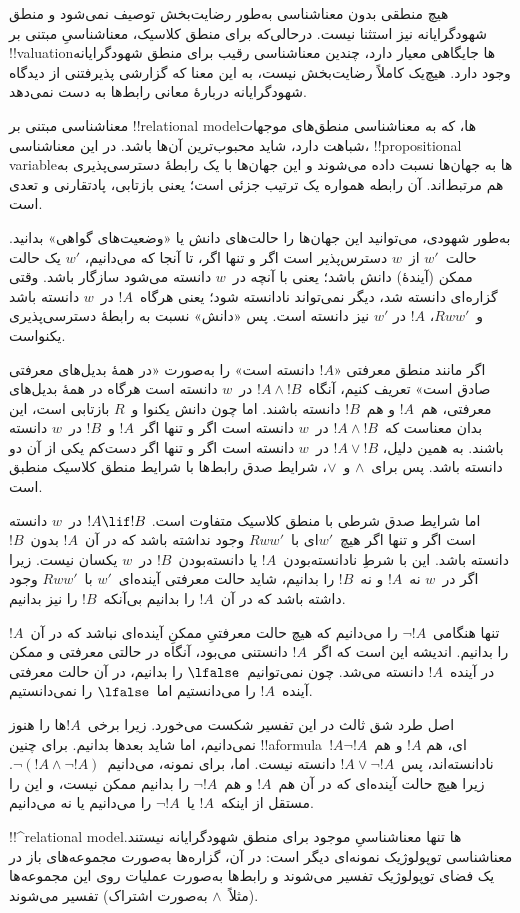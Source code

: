 \documentclass[../../../include/open-logic-section]{subfiles}
\begin{document}


هیچ منطقی بدون معناشناسی به‌طور رضایت‌بخش توصیف نمی‌شود و منطق
شهودگرایانه نیز استثنا نیست. درحالی‌که برای منطق کلاسیک، معناشناسیِ
مبتنی بر !!{valuation}ها جایگاهی معیار دارد، چندین معناشناسی رقیب برای
منطق شهودگرایانه وجود دارد. هیچ‌یک کاملاً رضایت‌بخش نیست، به این معنا
که گزارشی پذیرفتنی از دیدگاه شهودگرایانه دربارهٔ معانی رابط‌ها به دست
نمی‌دهد.

معناشناسی مبتنی بر !!{relational model}ها، که به معناشناسی منطق‌های
موجهات شباهت دارد، شاید محبوب‌ترین آن‌ها باشد. در این معناشناسی،
!!{propositional variable}ها به جهان‌ها نسبت داده می‌شوند و این جهان‌ها
با یک رابطهٔ دسترسی‌پذیری به هم مرتبط‌اند. آن رابطه همواره یک ترتیب
جزئی است؛ یعنی بازتابی، پادتقارنی و تعدی است.

به‌طور شهودی، می‌توانید این جهان‌ها را حالت‌های دانش یا «وضعیت‌های
گواهی» بدانید. حالت~$w'$ از~$w$ دسترس‌پذیر است اگر و تنها اگر، تا آنجا
که می‌دانیم، $w'$ یک حالت ممکن (آیندهٔ) دانش باشد؛ یعنی با آنچه در~$w$
دانسته می‌شود سازگار باشد. وقتی گزاره‌ای دانسته شد، دیگر نمی‌تواند
نادانسته شود؛ یعنی هرگاه~$!A$ در~$w$ دانسته باشد و~$Rww'$، $!A$ در
$w'$ نیز دانسته است. پس «دانش» نسبت به رابطهٔ دسترسی‌پذیری یکنواست.

اگر مانند منطق معرفتی «$!A$ دانسته است» را به‌صورت «در همهٔ بدیل‌های
معرفتی صادق است» تعریف کنیم، آنگاه~$!A \land !B$ در~$w$ دانسته است
هرگاه در همهٔ بدیل‌های معرفتی، هم~$!A$ و هم~$!B$ دانسته باشند. اما چون
دانش یکنوا و~$R$ بازتابی است، این بدان معناست که~$!A \land !B$ در~$w$
دانسته است اگر و تنها اگر~$!A$ و~$!B$ در~$w$ دانسته باشند. به همین
دلیل، $!A \lor !B$ در~$w$ دانسته است اگر و تنها اگر دست‌کم یکی از آن
دو دانسته باشد. پس برای~$\land$ و~$\lor$، شرایط صدق رابط‌ها با شرایط
منطق کلاسیک منطبق است.

اما شرایط صدق شرطی با منطق کلاسیک متفاوت است. $!A \lif !B$ در~$w$
دانسته است اگر و تنها اگر هیچ~$w'$ای با~$Rww'$ وجود نداشته باشد که در
آن~$!A$ بدون~$!B$ دانسته باشد. این با شرطِ نادانسته‌بودن~$!A$ یا
دانسته‌بودن~$!B$ در~$w$ یکسان نیست. زیرا اگر در~$w$ نه~$!A$ و نه~$!B$
را بدانیم، شاید حالت معرفتی آینده‌ای~$w'$ با~$Rww'$ وجود داشته باشد
که در آن~$!A$ را بدانیم بی‌آنکه~$!B$ را نیز بدانیم.

تنها هنگامی~$\lnot !A$ را می‌دانیم که هیچ حالت معرفتیِ ممکنِ آینده‌ای
نباشد که در آن~$!A$ را بدانیم. اندیشه این است که اگر~$!A$ دانستنی
می‌بود، آنگاه در حالتی معرفتی و ممکن در آینده~$!A$ دانسته می‌شد. چون
نمی‌توانیم~$\lfalse$ را بدانیم، در آن حالت معرفتی آینده~$!A$ را
می‌دانستیم اما~$\lfalse$ را نمی‌دانستیم.

اصل طرد شق ثالث در این تفسیر شکست می‌خورد. زیرا برخی~$!A$ها را هنوز
نمی‌دانیم، اما شاید بعدها بدانیم. برای چنین !!a{formula}~$!A$ای، هم
$!A$ و هم~$\lnot !A$ نادانسته‌اند، پس~$!A \lor \lnot !A$ دانسته نیست.
اما، برای نمونه، می‌دانیم~$\lnot(!A \land \lnot !A)$. زیرا هیچ حالت
آینده‌ای که در آن هم~$!A$ و هم~$\lnot !A$ را بدانیم ممکن نیست، و این
را مستقل از اینکه~$!A$ یا~$\lnot !A$ را می‌دانیم یا نه می‌دانیم.

!!^{relational model}ها تنها معناشناسیِ موجود برای منطق شهودگرایانه
نیستند. معناشناسی توپولوژیک نمونه‌ای دیگر است: در آن، گزاره‌ها به‌صورت
مجموعه‌های باز در یک فضای توپولوژیک تفسیر می‌شوند و رابط‌ها به‌صورت
عملیات روی این مجموعه‌ها (مثلاً~$\land$ به‌صورت اشتراک) تفسیر می‌شوند.
\end{document}
